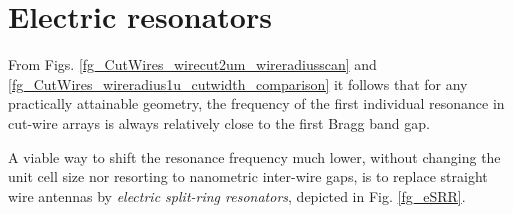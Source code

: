 \section{Electric resonators} \label{section_esrr} %
From Figs. \ref{fg_CutWires_wirecut2um_wireradiusscan} and \ref{fg_CutWires_wireradius1u_cutwidth_comparison} it follows that for any practically attainable geometry, the frequency of the first individual resonance in cut-wire arrays is always relatively close to the first Bragg band gap. 

A viable way to shift the resonance frequency much lower, without changing the unit cell size nor resorting to nanometric inter-wire gaps, is to replace straight wire antennas by \textit{electric split-ring resonators}, %
depicted in Fig. \ref{fg_eSRR}.


